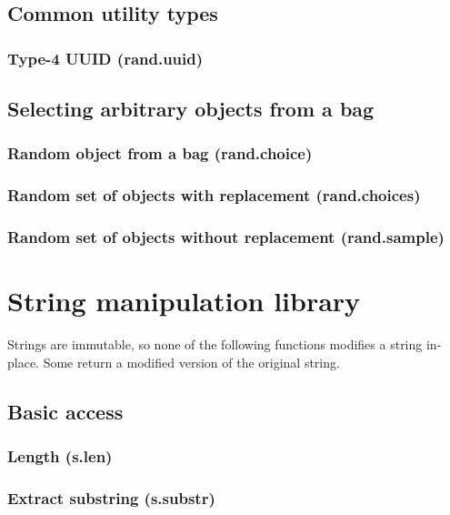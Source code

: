 \documentclass{article}
\theoremstyle{definition}
\begin{document}
\subsection{Common utility types}

\subsubsection{Type-4 UUID (rand.uuid)}

\subsection{Selecting arbitrary objects from a bag}

\subsubsection{Random object from a bag (rand.choice)}

\subsubsection{Random set of objects with replacement (rand.choices)}

\subsubsection{Random set of objects without replacement (rand.sample)}

\pagebreak

\section{String manipulation library}

Strings are immutable, so none of the following functions modifies a string in-place.  Some return a modified version of the original string.

\subsection{Basic access}

\subsubsection{Length (s.len)}

\subsubsection{Extract substring (s.substr)}
\end{document}
